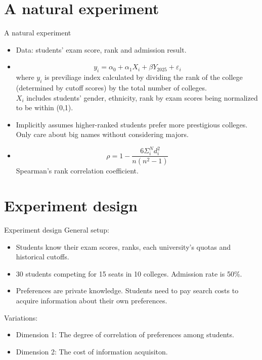 \documentclass[dvipsnames,mathserif]{beamer}
\begin{document}
{\section{A natural experiment}
\begin{frame}{A natural experiment}
	\begin{itemize}
		\item Data: students' exam score, rank and admission result.
        \item \[y_i = \alpha_0 + \alpha_1 X_i + \beta Y_{2025} + \varepsilon_i\]
        where $y_i$ is previliage index calculated by dividing the rank of the college (determined by cutoff scores) by the total number of colleges.\\
        $X_i$ includes students' gender, ethnicity, rank by exam scores being normalized to be within (0,1).\\
        \item Implicitly assumes higher-ranked students prefer more prestigious colleges. Only care about big names without considering majors. \\
        \item \[\rho = 1 -  \frac{6\Sigma_{i}^{N}d_i^2}{n(n^2-1)}\]
        Spearman's rank correlation coefficient.
    \end{itemize}
\end{frame}

\section{Experiment design}
\begin{frame}{Experiment design}
General setup:
    \begin{itemize}
        \item Students know their exam scores, ranks, each university's quotas and historical cutoffs. 
        \item 30 students competing for 15 seats in 10 colleges. Admission rate is 50\%.
        \item Preferences are private knowledge. Students need to pay search costs to acquire information about their own preferences.\\
    \end{itemize}
Variations:
	\begin{itemize}
		\item Dimension 1: The degree of correlation of preferences among students.\\
		\item Dimension 2: The cost of information acquisiton.
	\end{itemize}
\end{frame}

}
\end{document}
